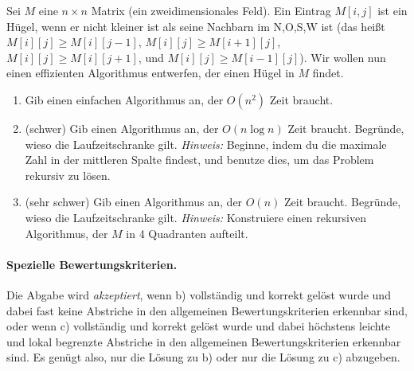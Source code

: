\documentclass{uebung_cs}
\begin{document}
	Sei $M$ eine $n\times n$ Matrix (ein zweidimensionales Feld).
	Ein Eintrag $M[i,j]$ ist ein Hügel, wenn er nicht kleiner ist als seine Nachbarn im N,O,S,W ist (das heißt $M[i][j]\ge M[i][j-1]$, $M[i][j]\ge M[i+1][j]$, $M[i][j]\ge M[i][j+1]$, und $M[i][j]\ge M[i-1][j]$).
	Wir wollen nun einen effizienten Algorithmus entwerfen, der einen Hügel in $M$ findet.
	\begin{enumerate}
		\item Gib einen einfachen Algorithmus an, der $O(n^2)$ Zeit braucht.
		\item (schwer) Gib einen Algorithmus an, der $O(n \log n)$ Zeit braucht. Begründe, wieso die Laufzeitschranke gilt. \emph{Hinweis:} Beginne, indem du die maximale Zahl in der mittleren Spalte findest, und benutze dies, um das Problem rekursiv zu lösen.
		\item (sehr schwer) Gib einen Algorithmus an, der $O(n)$ Zeit braucht. Begründe, wieso die Laufzeitschranke gilt. \emph{Hinweis:} Konstruiere einen rekursiven Algorithmus, der $M$ in 4 Quadranten aufteilt.
	\end{enumerate}

\paragraph{Spezielle Bewertungskriterien.}
Die Abgabe wird \emph{akzeptiert}, wenn b) vollständig und korrekt gelöst wurde und dabei fast keine Abstriche in den allgemeinen Bewertungskriterien erkennbar sind, oder wenn c) vollständig und korrekt gelöst wurde und dabei höchstens leichte und lokal begrenzte Abstriche in den allgemeinen Bewertungskriterien erkennbar sind.
Es genügt also, nur die Lösung zu b) oder nur die Lösung zu c) abzugeben.


\end{document}
